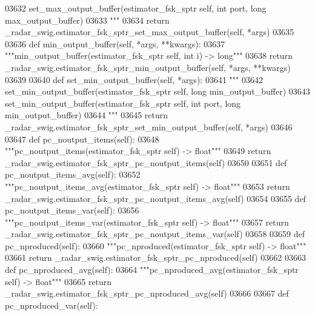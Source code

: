 \begin{DoxyCode}
{{{{{{{{{{{{{03632 \textcolor{stringliteral}{        set\_max\_output\_buffer(estimator\_fsk\_sptr self, int port, long max\_output\_buffer)}
03633 \textcolor{stringliteral}{        """}
03634         \textcolor{keywordflow}{return} \_radar\_swig.estimator\_fsk\_sptr\_set\_max\_output\_buffer(self, *args)
03635 
03636     \textcolor{keyword}{def }min_output_buffer(self, *args, **kwargs):
03637         \textcolor{stringliteral}{"""min\_output\_buffer(estimator\_fsk\_sptr self, int i) -> long"""}
03638         \textcolor{keywordflow}{return} \_radar\_swig.estimator\_fsk\_sptr\_min\_output\_buffer(self, *args, **kwargs)
03639 
03640     \textcolor{keyword}{def }set_min_output_buffer(self, *args):
03641         \textcolor{stringliteral}{"""}
03642 \textcolor{stringliteral}{        set\_min\_output\_buffer(estimator\_fsk\_sptr self, long min\_output\_buffer)}
03643 \textcolor{stringliteral}{        set\_min\_output\_buffer(estimator\_fsk\_sptr self, int port, long min\_output\_buffer)}
03644 \textcolor{stringliteral}{        """}
03645         \textcolor{keywordflow}{return} \_radar\_swig.estimator\_fsk\_sptr\_set\_min\_output\_buffer(self, *args)
03646 
03647     \textcolor{keyword}{def }pc_noutput_items(self):
03648         \textcolor{stringliteral}{"""pc\_noutput\_items(estimator\_fsk\_sptr self) -> float"""}
03649         \textcolor{keywordflow}{return} \_radar\_swig.estimator\_fsk\_sptr\_pc\_noutput\_items(self)
03650 
03651     \textcolor{keyword}{def }pc_noutput_items_avg(self):
03652         \textcolor{stringliteral}{"""pc\_noutput\_items\_avg(estimator\_fsk\_sptr self) -> float"""}
03653         \textcolor{keywordflow}{return} \_radar\_swig.estimator\_fsk\_sptr\_pc\_noutput\_items\_avg(self)
03654 
03655     \textcolor{keyword}{def }pc_noutput_items_var(self):
03656         \textcolor{stringliteral}{"""pc\_noutput\_items\_var(estimator\_fsk\_sptr self) -> float"""}
03657         \textcolor{keywordflow}{return} \_radar\_swig.estimator\_fsk\_sptr\_pc\_noutput\_items\_var(self)
03658 
03659     \textcolor{keyword}{def }pc_nproduced(self):
03660         \textcolor{stringliteral}{"""pc\_nproduced(estimator\_fsk\_sptr self) -> float"""}
03661         \textcolor{keywordflow}{return} \_radar\_swig.estimator\_fsk\_sptr\_pc\_nproduced(self)
03662 
03663     \textcolor{keyword}{def }pc_nproduced_avg(self):
03664         \textcolor{stringliteral}{"""pc\_nproduced\_avg(estimator\_fsk\_sptr self) -> float"""}
03665         \textcolor{keywordflow}{return} \_radar\_swig.estimator\_fsk\_sptr\_pc\_nproduced\_avg(self)
03666 
03667     \textcolor{keyword}{def }pc_nproduced_var(self):
}}}}}}}}}}}}}
\end{DoxyCode}
